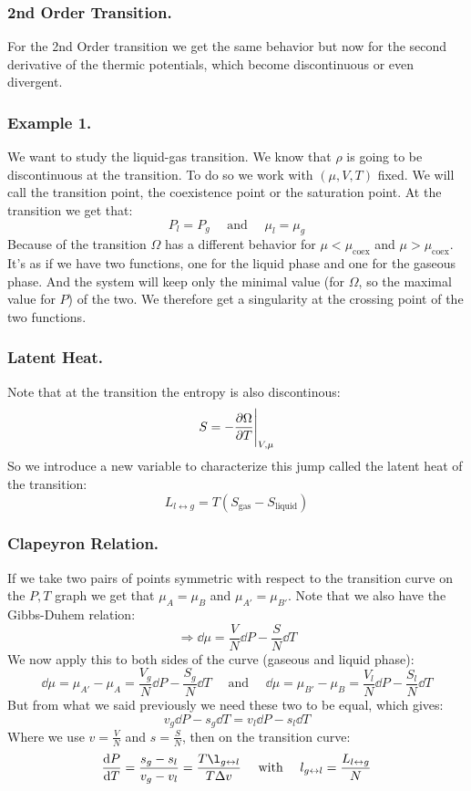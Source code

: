 \documentclass[10pt,a4paper]{book}
\begin{document}
\subsubsection{2nd Order Transition.}
For the 2nd Order transition we get the same behavior but now for the second derivative of the thermic potentials, which become discontinuous or even divergent.

\subsubsection{Example 1.}
We want to study the liquid-gas transition. We know that $\rho$ is going to be discontinuous at the transition. To do so we work with $(\mu, V, T)$ fixed. We will call the transition point, the coexistence point or the saturation point. At the transition we get that:
\[
P_l = P_g \quad \text{ and } \quad \mu_l = \mu_g
\]
Because of the transition $\Omega$ has a different behavior for $\mu < \mu_\text{coex}$ and $\mu > \mu_\text{coex}$. It's as if we have two functions, one for the liquid phase and one for the gaseous phase. And the system will keep only the minimal value (for $\Omega$, so the maximal value for $P$) of the two. We therefore get a singularity at the crossing point of the two functions.

\subsubsection{Latent Heat.}
Note that at the transition the entropy is also discontinous:
\[
S = - \pdv{\Omega}{T}\Bigg|_{V, \mu}
\]
So we introduce a new variable to characterize this jump called the latent heat of the transition:
\[
L_{l\leftrightarrow g} = T (S_\text{gas} - S_\text{liquid})
\]

\subsubsection{Clapeyron Relation.}
If we take two pairs of points symmetric with respect to the transition curve on the $P,T$ graph we get that $\mu_A = \mu_B$ and $\mu_{A'} = \mu_{B'}$. Note that we also have the Gibbs-Duhem relation:
\[
\Rightarrow \dd \mu = \frac{V}{N} \dd P - \frac{S}{N}\dd T
\]
We now apply this to both sides of the curve (gaseous and liquid phase):
\[
\dd \mu = \mu_{A'} - \mu_A = \frac{V_g}{N} \dd P - \frac{S_g}{N} \dd T \quad \text{ and } \quad \dd \mu = \mu_{B'} - \mu_{B} = \frac{V_l}{N} \dd P - \frac{S_l}{N}\dd T
\]
But from what we said previously we need these two to be equal, which gives:
\[
v_g \dd P - s_g \dd T = v_l \dd P - s_l \dd T
\]
Where we use $v = \frac{V}{N}$ and $s = \frac{S}{N}$, then on the transition curve:
\[
\dv{P}{T} = \frac{s_g - s_l}{v_g - v_l} = \frac{T \l_{g\leftrightarrow l}}{ T \Delta v} \quad \text{ with } \quad l_{g\leftrightarrow l} = \frac{L_{l\leftrightarrow g}}{N}
\]
\end{document}
